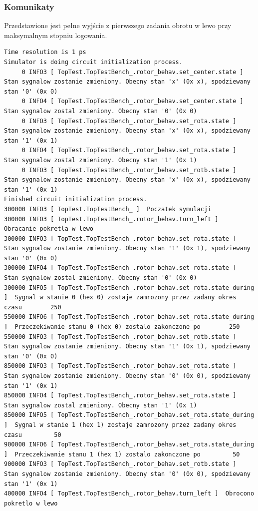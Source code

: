 \documentclass[a4paper,12pt]{article}
\begin{document}
\subsubsection{Komunikaty}

Przedstawione jest pełne wyjście z pierwszego zadania obrotu w lewo przy maksymalnym stopniu logowania.

\begin{lstlisting}
Time resolution is 1 ps
Simulator is doing circuit initialization process.
     0 INFO3 [ TopTest.TopTestBench_.rotor_behav.set_center.state ]  Stan sygnalow zostanie zmieniony. Obecny stan 'x' (0x x), spodziewany stan '0' (0x 0)
     0 INFO4 [ TopTest.TopTestBench_.rotor_behav.set_center.state ]  Stan sygnalow zostal zmieniony. Obecny stan '0' (0x 0)
     0 INFO3 [ TopTest.TopTestBench_.rotor_behav.set_rota.state ]  Stan sygnalow zostanie zmieniony. Obecny stan 'x' (0x x), spodziewany stan '1' (0x 1)
     0 INFO4 [ TopTest.TopTestBench_.rotor_behav.set_rota.state ]  Stan sygnalow zostal zmieniony. Obecny stan '1' (0x 1)
     0 INFO3 [ TopTest.TopTestBench_.rotor_behav.set_rotb.state ]  Stan sygnalow zostanie zmieniony. Obecny stan 'x' (0x x), spodziewany stan '1' (0x 1)
Finished circuit initialization process.
300000 INFO3 [ TopTest.TopTestBench_ ]  Poczatek symulacji
300000 INFO3 [ TopTest.TopTestBench_.rotor_behav.turn_left ]  Obracanie pokretla w lewo
300000 INFO3 [ TopTest.TopTestBench_.rotor_behav.set_rota.state ]  Stan sygnalow zostanie zmieniony. Obecny stan '1' (0x 1), spodziewany stan '0' (0x 0)
300000 INFO4 [ TopTest.TopTestBench_.rotor_behav.set_rota.state ]  Stan sygnalow zostal zmieniony. Obecny stan '0' (0x 0)
300000 INFO5 [ TopTest.TopTestBench_.rotor_behav.set_rota.state_during ]  Sygnal w stanie 0 (hex 0) zostaje zamrozony przez zadany okres czasu        250
550000 INFO6 [ TopTest.TopTestBench_.rotor_behav.set_rota.state_during ]  Przeczekiwanie stanu 0 (hex 0) zostalo zakonczone po        250
550000 INFO3 [ TopTest.TopTestBench_.rotor_behav.set_rotb.state ]  Stan sygnalow zostanie zmieniony. Obecny stan '1' (0x 1), spodziewany stan '0' (0x 0)
850000 INFO3 [ TopTest.TopTestBench_.rotor_behav.set_rota.state ]  Stan sygnalow zostanie zmieniony. Obecny stan '0' (0x 0), spodziewany stan '1' (0x 1)
850000 INFO4 [ TopTest.TopTestBench_.rotor_behav.set_rota.state ]  Stan sygnalow zostal zmieniony. Obecny stan '1' (0x 1)
850000 INFO5 [ TopTest.TopTestBench_.rotor_behav.set_rota.state_during ]  Sygnal w stanie 1 (hex 1) zostaje zamrozony przez zadany okres czasu         50
900000 INFO6 [ TopTest.TopTestBench_.rotor_behav.set_rota.state_during ]  Przeczekiwanie stanu 1 (hex 1) zostalo zakonczone po         50
900000 INFO3 [ TopTest.TopTestBench_.rotor_behav.set_rotb.state ]  Stan sygnalow zostanie zmieniony. Obecny stan '0' (0x 0), spodziewany stan '1' (0x 1)
400000 INFO4 [ TopTest.TopTestBench_.rotor_behav.turn_left ]  Obrocono pokretlo w lewo
\end{lstlisting}
\end{document}
